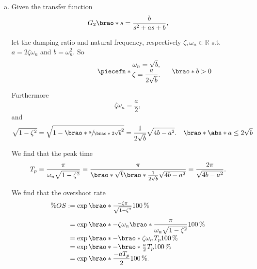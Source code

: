 \documentclass[12pt]{article}
\DeclarePairedDelimiter\brao()%
\DeclarePairedDelimiter\abs||
\DeclarePairedDelimiter\piecefn\{.
\begin{document}
\begin{enumerate}[(a)]
    \item
        Given the transfer function
        \begin{equation}
            G_2\brao*s = \frac{b}{s^2 + as + b},
        \end{equation}
        
        let the damping ratio and natural frequency, respectively $\zeta, \omega_n \in \mathbb{R}$ s.t. $a = 2\zeta\omega_n$ and $b = \omega_n^2$. So
        \begin{equation}
            \piecefn*{
                \begin{matrix}
                    \omega_n = \sqrt{b}\rlap, \\*
                    \zeta = \dfrac{a}{2\sqrt{b}}\rlap. \\*
                \end{matrix}
            }\rlap{$\qquad\brao*{b > 0}$}
        \end{equation}

        Furthermore
        \begin{equation}\label{eq:zwn}
            \zeta\omega_n = \frac{a}2,
        \end{equation}
        and
        \begin{equation}
            \sqrt{1 - \zeta^2} = \sqrt{1 - \brao*{\sfrac{a}{\brao*{2\sqrt{b}}}}^2} = \frac{1}{2\sqrt{b}} \sqrt{4b - a^2}.%
            \hskip1em\brao*{\abs*{a} \leq 2\sqrt{b}}
        \end{equation}
        
        We find that the peak time
        \begin{equation}\label{eq:peak time}
            T_p = \frac\pi{\omega_n \sqrt{1 - \zeta^2}} = \frac\pi{\brao*{\sqrt{b}}\brao*{ \frac{1}{2\sqrt{b}}\sqrt{4b - a^2}}} = \frac{2\pi}{\sqrt{4b - a^2}}.
        \end{equation}

        We find that the overshoot rate
        \begin{equation}\label{eq:overshoot}
            \begin{array}{*2{@{}r}@{}l@{}}\displaystyle
                \% OS
                &{}:={}& \exp\brao*{\frac{-\zeta\pi}{\sqrt{1 - \zeta^2}}} \SI{100}\percent
            \\*[1.3em]
                &{}={}& \exp\brao*{-\zeta\omega_n\brao*{\dfrac{\pi}{\omega_n\sqrt{1 - \zeta^2}}}} \SI{100}\percent
            \\*
                &{}={}& \exp\brao*{-\brao*{\zeta\omega_n}^{\vphantom{1}}T_p} \SI{100}\percent
            \\*
                &{}={}& \exp\brao*{-\brao*{\tfrac{a}2}^{\vphantom{1}}T_p} \SI{100}\percent
            \\*
                & {}={} & \exp\brao*{\dfrac{-aT_p}{2}} \SI{100}\percent\rlap.
            \\*
            \end{array}
        \end{equation}


\end{enumerate}
\end{document}
